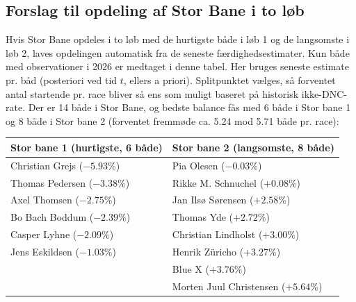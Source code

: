 \subsection*{Forslag til opdeling af Stor Bane i to løb}
Hvis Stor Bane opdeles i to løb med de hurtigste både i løb 1 og de langsomste i løb 2, laves opdelingen automatisk fra de seneste færdighedsestimater.
Kun både med observationer i 2026 er medtaget i denne tabel.
Her bruges seneste estimate pr. båd (posteriori ved tid $t$, ellers a priori). Splitpunktet vælges, så forventet antal startende pr. race bliver så ens som muligt baseret på historisk ikke-DNC-rate.
Der er 14 både i Stor Bane, og bedste balance fås med 6 både i Stor bane 1 og 8 både i Stor bane 2 (forventet fremmøde ca. 5.24 mod 5.71 både pr. race):

\begin{table}[H]
\centering
\begin{tabular}{ll}
\toprule
Stor bane 1 (hurtigste, 6 både) & Stor bane 2 (langsomste, 8 både) \\
\midrule
Christian Grejs (\(-5.93\%\)) & Pia Olesen (\(-0.03\%\)) \\
Thomas Pedersen (\(-3.38\%\)) & Rikke M. Schnuchel (\(+0.08\%\)) \\
Axel Thomsen (\(-2.75\%\)) & Jan Ilsø Sørensen (\(+2.58\%\)) \\
Bo Bach Boddum (\(-2.39\%\)) & Thomas Yde (\(+2.72\%\)) \\
Casper Lyhne (\(-2.09\%\)) & Christian Lindholst (\(+3.00\%\)) \\
Jens Eskildsen (\(-1.03\%\)) & Henrik Züricho (\(+3.27\%\)) \\
 & Blue X (\(+3.76\%\)) \\
 & Morten Juul Christensen (\(+5.64\%\)) \\
\bottomrule
\end{tabular}
\end{table}